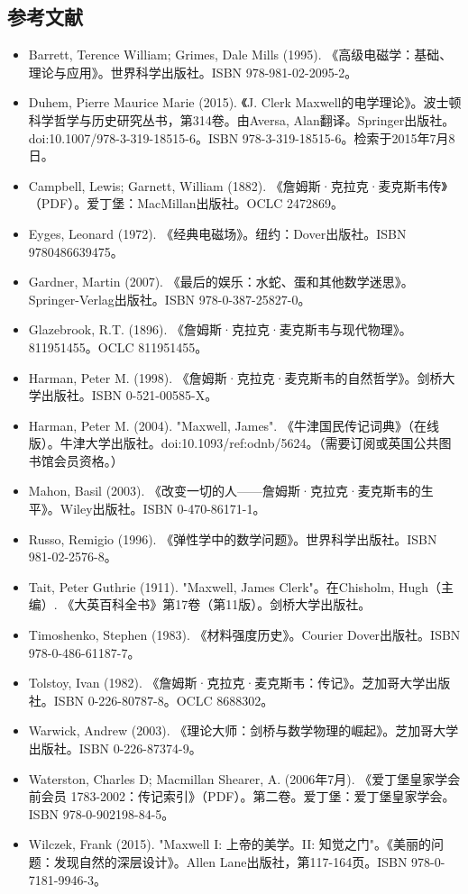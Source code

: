 \subsection{参考文献}  
\begin{itemize}
\item Barrett, Terence William; Grimes, Dale Mills (1995). 《高级电磁学：基础、理论与应用》。世界科学出版社。ISBN 978-981-02-2095-2。  
\item Duhem, Pierre Maurice Marie (2015). 《J. Clerk Maxwell的电学理论》。波士顿科学哲学与历史研究丛书，第314卷。由Aversa, Alan翻译。Springer出版社。doi:10.1007/978-3-319-18515-6。ISBN 978-3-319-18515-6。检索于2015年7月8日。  
\item Campbell, Lewis; Garnett, William (1882). 《詹姆斯·克拉克·麦克斯韦传》（PDF）。爱丁堡：MacMillan出版社。OCLC 2472869。  
\item Eyges, Leonard (1972). 《经典电磁场》。纽约：Dover出版社。ISBN 9780486639475。  
\item Gardner, Martin (2007). 《最后的娱乐：水蛇、蛋和其他数学迷思》。Springer-Verlag出版社。ISBN 978-0-387-25827-0。  
\item Glazebrook, R.T. (1896). 《詹姆斯·克拉克·麦克斯韦与现代物理》。811951455。OCLC 811951455。  
\item Harman, Peter M. (1998). 《詹姆斯·克拉克·麦克斯韦的自然哲学》。剑桥大学出版社。ISBN 0-521-00585-X。
\item Harman, Peter M. (2004). "Maxwell, James". 《牛津国民传记词典》（在线版）。牛津大学出版社。doi:10.1093/ref:odnb/5624。（需要订阅或英国公共图书馆会员资格。）
\item Mahon, Basil (2003). 《改变一切的人——詹姆斯·克拉克·麦克斯韦的生平》。Wiley出版社。ISBN 0-470-86171-1。
\item Russo, Remigio (1996). 《弹性学中的数学问题》。世界科学出版社。ISBN 981-02-2576-8。
\item Tait, Peter Guthrie (1911). "Maxwell, James Clerk"。在Chisholm, Hugh（主编）. 《大英百科全书》第17卷（第11版）。剑桥大学出版社。
\item Timoshenko, Stephen (1983). 《材料强度历史》。Courier Dover出版社。ISBN 978-0-486-61187-7。
\item Tolstoy, Ivan (1982). 《詹姆斯·克拉克·麦克斯韦：传记》。芝加哥大学出版社。ISBN 0-226-80787-8。OCLC 8688302。
\item Warwick, Andrew (2003). 《理论大师：剑桥与数学物理的崛起》。芝加哥大学出版社。ISBN 0-226-87374-9。
\item Waterston, Charles D; Macmillan Shearer, A. (2006年7月). 《爱丁堡皇家学会前会员 1783-2002：传记索引》（PDF）。第二卷。爱丁堡：爱丁堡皇家学会。ISBN 978-0-902198-84-5。
\item Wilczek, Frank (2015). "Maxwell I: 上帝的美学。II: 知觉之门"。《美丽的问题：发现自然的深层设计》。Allen Lane出版社，第117-164页。ISBN 978-0-7181-9946-3。
\end{itemize}